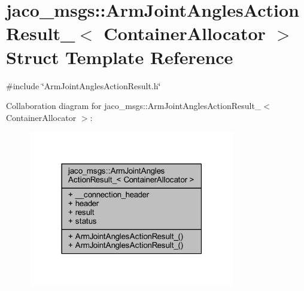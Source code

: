 \hypertarget{structjaco__msgs_1_1ArmJointAnglesActionResult__}{}\section{jaco\+\_\+msgs\+:\+:Arm\+Joint\+Angles\+Action\+Result\+\_\+$<$ Container\+Allocator $>$ Struct Template Reference}
\label{structjaco__msgs_1_1ArmJointAnglesActionResult__}


{\ttfamily \#include \char`\"{}Arm\+Joint\+Angles\+Action\+Result.\+h\char`\"{}}



Collaboration diagram for jaco\+\_\+msgs\+:\+:Arm\+Joint\+Angles\+Action\+Result\+\_\+$<$ Container\+Allocator $>$\+:
\nopagebreak
\begin{figure}[H]
\begin{center}
\leavevmode
\includegraphics[width=255pt]{d3/d24/structjaco__msgs_1_1ArmJointAnglesActionResult____coll__graph}
\end{center}
\end{figure}
